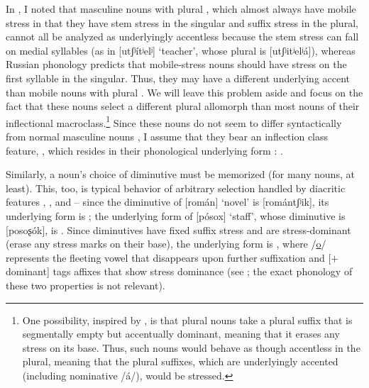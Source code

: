 \documentclass[output=paper,colorlinks,citecolor=brown
]{langscibook}
\begin{document}
In , I noted that masculine nouns with plural \pla{}, which almost always have mobile stress in that they have stem stress in the singular and suffix stress in the plural, cannot all be analyzed as underlyingly accentless because the stem stress can fall on medial syllables (as in [utʃʲítʲelʲ] `teacher', whose plural is [utʃʲitʲelʲá]), whereas Russian phonology predicts that mobile-stress nouns should have stress on the first syllable in the singular. Thus, they may have a different underlying accent than mobile nouns with plural \pli. We will leave this problem aside and focus on the fact that these nouns select a different plural allomorph than most nouns of their inflectional macroclass.\footnote{One possibility, inspired by \citet{Matushansky2024}, is that plural \pla{} nouns take a plural suffix that is segmentally empty but accentually dominant, meaning that it erases any stress on its base. Thus, such nouns would behave as though accentless in the plural, meaning that the plural suffixes, which are underlyingly accented (including nominative /á/), would be stressed.} Since these nouns do not seem to differ syntactically from normal masculine nouns \citep{Matushansky2025}, I assume that they bear an inflection class feature, , which resides in their phonological underlying form \citep{Harley.TubinoBlanco2013,Gouskova.Bobaljik2022,Tabachnick2023}: %
.

Similarly, a noun's choice of diminutive must be memorized (for many nouns, at least). This, too, is typical behavior of arbitrary selection handled by diacritic features , , and  -- since the diminutive of [román] `novel' is [romántʃʲik], its underlying form is ; the underlying form of [pósox] `staff', whose diminutive is [posoʂók], is . Since \ok{} diminutives have fixed suffix stress and are stress-dominant (erase any stress marks on their base), the underlying form is , where /\underline{o}/ represents the fleeting vowel that disappears upon further suffixation and [$+$dominant] tags affixes that show stress dominance (see ; the exact phonology of these two properties is not relevant).
\end{document}
